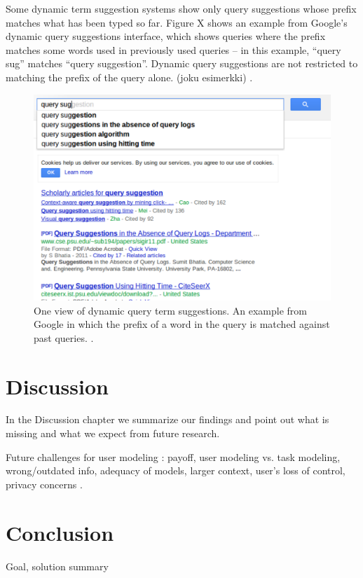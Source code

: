 \documentclass{sigchi}
\begin{document}
Some dynamic term suggestion systems show only query suggestions whose prefix matches what has been typed so far. Figure X shows an example from Google’s dynamic query suggestions interface, which shows queries where the prefix matches some words used in previously used queries – in this example, “query sug” matches “query suggestion”. Dynamic query suggestions are not restricted to matching the prefix of the query alone.  (joku esimerkki) . 

\begin{figure}[htp] %
\caption{One view of dynamic query term suggestions. An example from Google in which the prefix of a word in the query is matched against past queries. \protect.}   \label{querysuggestion}
\includegraphics[scale=0.41]{figures/dynamicQueryTermSuggestion2.pdf} 
\end{figure}


\section{Discussion}
In the Discussion chapter we summarize our findings and point out what is missing and what we expect from future research. 

Future challenges for user modeling : payoff, user modeling vs. task modeling, wrong/outdated info, adequacy of models, larger context, user's loss of control, privacy concerns \cite{fischer01}.

\section{Conclusion}
Goal, solution summary
\end{document}
